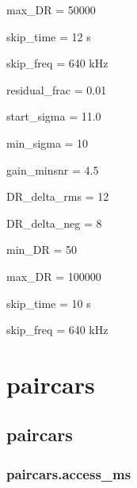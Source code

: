 \documentclass[letterpaper,10pt,english]{sphinxmanual}
\begin{document}
\sphinxAtStartPar
max\_DR                  =       50000

\sphinxAtStartPar
skip\_time               =       12 s

\sphinxAtStartPar
skip\_freq               =       640 kHz

\sphinxAtStartPar
{}

\sphinxAtStartPar
residual\_frac   =  0.01

\sphinxAtStartPar
start\_sigma             =       11.0

\sphinxAtStartPar
min\_sigma               =       10

\sphinxAtStartPar
gain\_minsnr             =       4.5

\sphinxAtStartPar
DR\_delta\_rms    =       12

\sphinxAtStartPar
DR\_delta\_neg    =       8

\sphinxAtStartPar
min\_DR                  =       50

\sphinxAtStartPar
max\_DR                  =       100000

\sphinxAtStartPar
skip\_time               =       10 s

\sphinxAtStartPar
skip\_freq               =       640 kHz


\chapter{paircars}
\label{\detokenize{modules:paircars}}\label{\detokenize{modules::doc}}

\section{paircars}
\label{\detokenize{paircars:paircars}}\label{\detokenize{paircars::doc}}

\subsection{paircars.access\_ms}
\label{\detokenize{paircars:module-paircars.access_ms}}\label{\detokenize{paircars:paircars-access-ms}}
\end{document}
